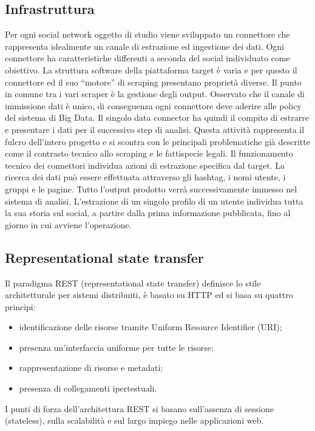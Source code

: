 \subsection{Infrastruttura}
Per ogni social network oggetto di studio viene sviluppato un connettore che rappresenta idealmente un canale di estrazione ed ingestione dei dati.
Ogni connettore ha caratteristiche differenti a seconda del social individuato come obiettivo. La struttura software della piattaforma target \`e varia e per questo il connettore ed il suo ``motore'' di scraping presentano propriet\`a diverse.
Il punto in comune tra i vari scraper \`e la gestione degli output. Osservato che il canale di immissione dati \`e unico, di conseguenza ogni connettore deve aderire alle policy del sistema di Big Data.
Il singolo data connector ha quindi il compito di estrarre e presentare i dati per il successivo step di analisi.\cite{xu2014information}
Questa attivit\`a rappresenta il fulcro dell'intero progetto e si scontra con le principali problematiche gi\`a descritte come il contrasto tecnico allo scraping e le fattispecie legali.
Il funzionamento tecnico dei connettori individua azioni di estrazione specifica dal target. La ricerca dei dati pu\`o essere effettuata attraverso gli hashtag, i nomi utente, i gruppi e le pagine. Tutto l'output prodotto verr\`a successivamente immesso nel sistema di analisi. 
L'estrazione di un singolo profilo di un utente individua tutta la sua storia sul social, a partire dalla prima informazione pubblicata, fino al giorno in cui avviene l'operazione.

\subsection{Representational state transfer} \label{REST}
Il paradigma REST (representational state transfer) definisce lo stile architetturale per sistemi distribuiti, \`e basato su HTTP ed si basa su quattro principi:
\begin{itemize}
    \item identificazione delle risorse tramite Uniform Resource Identifier (URI);
    \item presenza un'interfaccia uniforme per tutte le risorse;
    \item rappresentazione di risorse e metadati;
    \item presenza di collegamenti ipertestuali.
\end{itemize}
I punti di forza dell'architettura REST si basano sull'assenza di sessione (stateless), sulla scalabilit\`a e sul largo impiego nelle applicazioni web.

